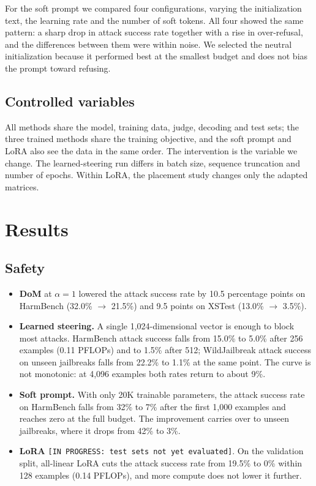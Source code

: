 \documentclass{article}
\begin{document}
For the soft prompt we compared four configurations, varying the initialization text, the learning rate and the number of soft tokens. All four showed the same pattern: a sharp drop in attack success rate together with a rise in over-refusal, and the differences between them were within noise. We selected the neutral initialization because it performed best at the smallest budget and does not bias the prompt toward refusing.

\subsection{Controlled variables}\label{sec:4.6}

All methods share the model, training data, judge, decoding and test sets; the three trained methods share the training objective, and the soft prompt and LoRA also see the data in the same order. The intervention is the variable we change. The learned-steering run differs in batch size, sequence truncation and number of epochs. Within LoRA, the placement study changes only the adapted matrices.

\section{Results}\label{sec:5}

\subsection{Safety}\label{sec:5.1}

\begin{itemize}
\item \textbf{DoM} at $\alpha = 1$ lowered the attack success rate by 10.5 percentage points on HarmBench (32.0\% \(\to\) 21.5\%) and 9.5 points on XSTest (13.0\% \(\to\) 3.5\%).
\item \textbf{Learned steering.} A single 1,024-dimensional vector is enough to block most attacks. HarmBench attack success falls from 15.0\% to 5.0\% after 256 examples (0.11 PFLOPs) and to 1.5\% after 512; WildJailbreak attack success on unseen jailbreaks falls from 22.2\% to 1.1\% at the same point. The curve is not monotonic: at 4,096 examples both rates return to about 9\%.
\item \textbf{Soft prompt.} With only 20K trainable parameters, the attack success rate on HarmBench falls from 32\% to 7\% after the first 1,000 examples and reaches zero at the full budget. The improvement carries over to unseen jailbreaks, where it drops from 42\% to 3\%.
\item \textbf{LoRA} \texttt{[IN PROGRESS: test sets not yet evaluated]}. On the validation split, all-linear LoRA cuts the attack success rate from 19.5\% to 0\% within 128 examples (0.14 PFLOPs), and more compute does not lower it further.
\end{itemize}
\end{document}
